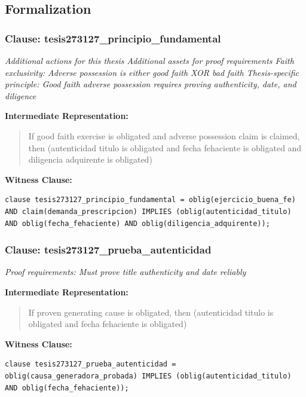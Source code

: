 \documentclass[11pt,a4paper]{article}
\begin{document}
\subsection{Formalization}

\subsubsection{Clause: tesis273127\_principio\_fundamental}

\textit{Additional actions for this thesis Additional assets for proof requirements Faith exclusivity: Adverse possession is either good faith XOR bad faith Thesis-specific principle: Good faith adverse possession requires proving authenticity, date, and diligence}

\textbf{Intermediate Representation:}

\begin{quote}
If good faith exercise is obligated and adverse possession claim is claimed, then (autenticidad titulo is obligated and fecha fehaciente is obligated and diligencia adquirente is obligated)
\end{quote}

\textbf{Witness Clause:}

\begin{lstlisting}[style=witnessstyle, language=Witness]
clause tesis273127_principio_fundamental = oblig(ejercicio_buena_fe) AND claim(demanda_prescripcion) IMPLIES (oblig(autenticidad_titulo) AND oblig(fecha_fehaciente) AND oblig(diligencia_adquirente));
\end{lstlisting}

\subsubsection{Clause: tesis273127\_prueba\_autenticidad}

\textit{Proof requirements: Must prove title authenticity and date reliably}

\textbf{Intermediate Representation:}

\begin{quote}
If proven generating cause is obligated, then (autenticidad titulo is obligated and fecha fehaciente is obligated)
\end{quote}

\textbf{Witness Clause:}

\begin{lstlisting}[style=witnessstyle, language=Witness]
clause tesis273127_prueba_autenticidad = oblig(causa_generadora_probada) IMPLIES (oblig(autenticidad_titulo) AND oblig(fecha_fehaciente));
\end{lstlisting}
\end{document}
